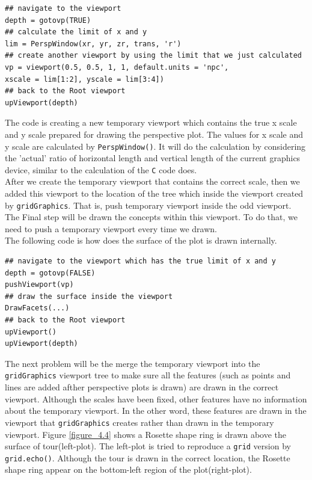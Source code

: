 \documentclass[paper=a4, fontsize=11pt]{report}
\begin{document}
\begin{lstlisting}
## navigate to the viewport
depth = gotovp(TRUE) 
## calculate the limit of x and y
lim = PerspWindow(xr, yr, zr, trans, 'r')  
## create another viewport by using the limit that we just calculated
vp = viewport(0.5, 0.5, 1, 1, default.units = 'npc',
xscale = lim[1:2], yscale = lim[3:4]) 
## back to the Root viewport
upViewport(depth)  
\end{lstlisting}
The code is creating a new temporary viewport which contains the true x scale and y scale prepared for drawing the perspective plot. The values for x scale and y scale are calculated by \texttt{PerspWindow()}. It will do the calculation by considering the 'actual' ratio of horizontal length and vertical length of the current graphics device, similar to the calculation of the \texttt{C} code does.\\
After we create the temporary viewport that contains the correct scale, then we added this viewport to the location of the tree which inside the viewport created by \texttt{gridGraphics}. That is, push temporary viewport inside the odd viewport. The Final step will be drawn the concepts within this viewport. To do that, we need to push a temporary viewport every time we drawn.\\ 
The following code is how does the surface of the plot is drawn internally.
\begin{lstlisting}
## navigate to the viewport which has the true limit of x and y
depth = gotovp(FALSE)
pushViewport(vp)
## draw the surface inside the viewport
DrawFacets(...)
## back to the Root viewport
upViewport()
upViewport(depth)
\end{lstlisting}

The next problem will be the merge the temporary viewport into the \texttt{gridGraphics} viewport tree to make sure all the features (such as points and lines are added afther perspective plots is drawn) are drawn in the correct viewport. Although the scales have been fixed, other features have no information about the temporary viewport. In the other word, these features are drawn in the viewport that \texttt{gridGraphics} creates rather than drawn in the temporary viewport. Figure \ref{figure_4.4} shows a Rosette shape ring is drawn above the surface of tour(left-plot). The left-plot is tried to reproduce a \texttt{grid} version by \texttt{grid.echo()}. Although the tour is drawn in the correct location, the Rosette shape ring appear on the bottom-left region of the plot(right-plot).
\end{document}
